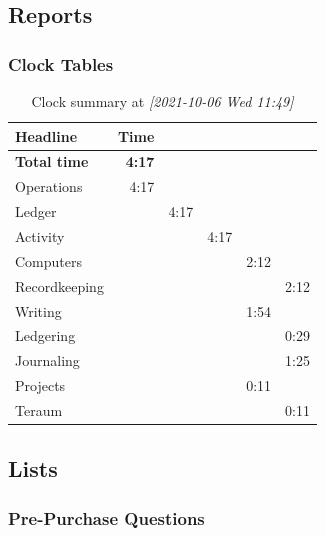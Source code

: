 \documentclass[11pt]{article}
\begin{document}
\subsection*{Reports}
\label{sec:org1653c91}
\startcontents[level-2]
\subsubsection*{Clock Tables}
\label{sec:orgfa1b74a}
\begin{table}[htbp]
\caption{Clock summary at \textit{[2021-10-06 Wed 11:49]}}
\centering
\begin{tabular}{lrrrrr}
Headline & Time &  &  &  & \\
\hline
\textbf{Total time} & \textbf{4:17} &  &  &  & \\
\hline
Operations & 4:17 &  &  &  & \\
\hspace*{1.0em}Ledger &  & 4:17 &  &  & \\
\hspace*{2.0em}Activity &  &  & 4:17 &  & \\
\hspace*{3.0em}Computers &  &  &  & 2:12 & \\
\hspace*{4.0em}Recordkeeping &  &  &  &  & 2:12\\
\hspace*{3.0em}Writing &  &  &  & 1:54 & \\
\hspace*{4.0em}Ledgering &  &  &  &  & 0:29\\
\hspace*{4.0em}Journaling &  &  &  &  & 1:25\\
\hspace*{3.0em}Projects &  &  &  & 0:11 & \\
\hspace*{4.0em}Teraum &  &  &  &  & 0:11\\
\end{tabular}
\end{table}
\stopcontents[level-2]
\subsection*{Lists}
\label{sec:org419825f}
\subsubsection*{Pre-Purchase Questions}
\label{sec:orgc5ec15c}
\end{document}
